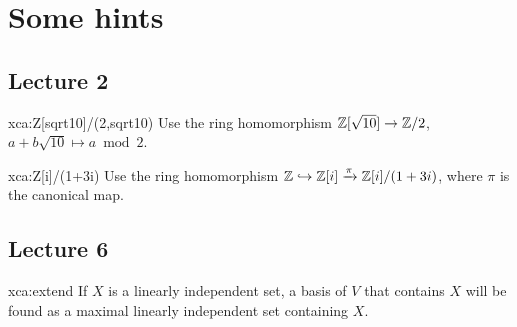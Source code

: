 \chapter*{Some hints}


\section*{Lecture 2}

\begin{sol}{xca:Z[sqrt10]/(2,sqrt10)}
	Use the ring homomorphism $\mathbb{Z}[\sqrt{10}]\to\mathbb{Z}/2$, $a+b\sqrt{10}\mapsto a\bmod 2$. 	
\end{sol}

\begin{sol}{xca:Z[i]/(1+3i)}
	Use the ring homomorphism $\mathbb{Z}\hookrightarrow\mathbb{Z}[i]\xrightarrow{\pi}\mathbb{Z}[i]/(1+3i)$, where
	$\pi$ is the canonical map. 	
\end{sol}

\section*{Lecture 6}

\begin{sol}{xca:extend}
    If $X$ is a linearly independent set, a basis 
    of $V$ that contains $X$ will be found as a maximal linearly independent set 
    containing $X$. 
\end{sol}





